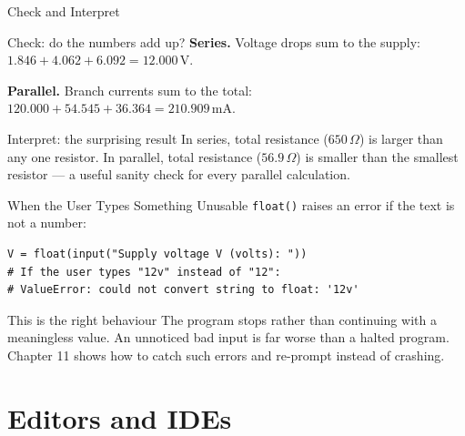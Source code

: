 \documentclass[9pt,aspectratio=169,xcolor=table]{beamer}
\begin{document}
\begin{frame}{Check and Interpret}
    \leavevmode
    \begin{block}{Check: do the numbers add up?}
        \small
        \textbf{Series.} Voltage drops sum to the supply: $1.846 + 4.062
        + 6.092 = 12.000\,\text{V}$. \checkmark

        \vspace{1mm}
        \textbf{Parallel.} Branch currents sum to the total: $120.000 +
        54.545 + 36.364 = 210.909\,\text{mA}$. \checkmark
    \end{block}

    \vspace{3mm}
    \begin{alertblock}{Interpret: the surprising result}
        In series, total resistance ($650\,\Omega$) is \alert{larger}
        than any one resistor. In parallel, total resistance
        ($56.9\,\Omega$) is \alert{smaller} than the smallest resistor
        --- a useful sanity check for every parallel calculation.
    \end{alertblock}
\end{frame}

\begin{frame}[fragile]{When the User Types Something Unusable}
    \leavevmode
    \texttt{float()} raises an error if the text is not a number:

\begin{lstlisting}
V = float(input("Supply voltage V (volts): "))
# If the user types "12v" instead of "12":
# ValueError: could not convert string to float: '12v'
\end{lstlisting}

    \vspace{3mm}
    \begin{block}{This is the right behaviour}
        The program stops rather than continuing with a meaningless
        value. An unnoticed bad input is far worse than a halted
        program. Chapter 11 shows how to catch such errors and re-prompt
        instead of crashing.
    \end{block}
\end{frame}

\section{Editors and IDEs}
\end{document}
